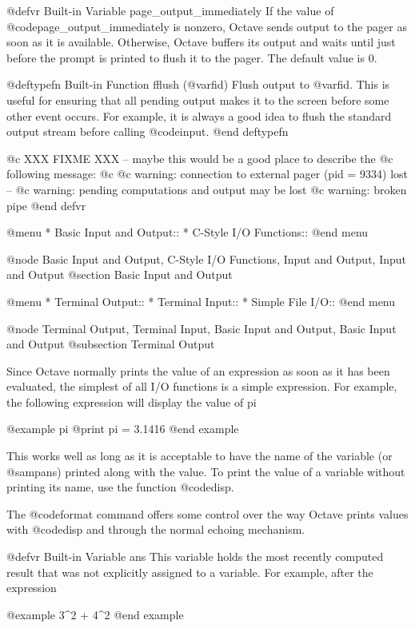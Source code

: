 @defvr {Built-in Variable} page_output_immediately
If the value of @code{page_output_immediately} is nonzero, Octave sends
output to the pager as soon as it is available.  Otherwise, Octave
buffers its output and waits until just before the prompt is printed to
flush it to the pager.  The default value is 0.

@deftypefn {Built-in Function} {} fflush (@var{fid})
Flush output to @var{fid}.  This is useful for ensuring that all
pending output makes it to the screen before some other event occurs.
For example, it is always a good idea to flush the standard output
stream before calling @code{input}.
@end deftypefn

@c XXX FIXME XXX -- maybe this would be a good place to describe the
@c following message:
@c
@c warning: connection to external pager (pid = 9334) lost --
@c warning: pending computations and output may be lost
@c warning: broken pipe
@end defvr

@menu
* Basic Input and Output::      
* C-Style I/O Functions::       
@end menu

@node Basic Input and Output, C-Style I/O Functions, Input and Output, Input and Output
@section Basic Input and Output

@menu
* Terminal Output::             
* Terminal Input::              
* Simple File I/O::             
@end menu

@node Terminal Output, Terminal Input, Basic Input and Output, Basic Input and Output
@subsection Terminal Output

Since Octave normally prints the value of an expression as soon as it
has been evaluated, the simplest of all I/O functions is a simple
expression.  For example, the following expression will display the
value of pi

@example
pi
     @print{} pi = 3.1416
@end example

This works well as long as it is acceptable to have the name of the
variable (or @samp{ans}) printed along with the value.  To print the
value of a variable without printing its name, use the function
@code{disp}.

The @code{format} command offers some control over the way Octave prints
values with @code{disp} and through the normal echoing mechanism.

@defvr {Built-in Variable} ans
This variable holds the most recently computed result that was not
explicitly assigned to a variable.  For example, after the expression

@example
3^2 + 4^2
@end example

